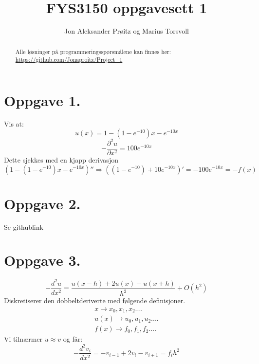 \documentclass[english,notitlepage]{revtex4-1}  %
\begin{document}
\title{FYS3150 oppgavesett 1}

\author{Jon Aleksander Prøitz og Marius Torsvoll}

\begin{abstract}
\noindent Alle løsninger på programmeringsspørsmålene kan finnes her: \\
\url{https://github.com/Jonaproitz/Project_1}
\end{abstract}

\maketitle


\section*{Oppgave 1.}
    \label{sec:oppgave1}
    Vis at:
    \begin{equation*}
            u(x) 
        =   1-(1-e^{-10})x - e^{-10x}
    \end{equation*}
    \begin{equation*}
            -\frac{\partial^2 u}{\partial x^2} 
        =   100e^{-10x}
    \end{equation*}
    Dette sjekkes med en kjapp derivasjon
    \begin{equation*}
            \left(1-(1-e^{-10})x - e^{-10x}\right)'' 
        \Rightarrow 
            \left((1-e^{-10}) + 10e^{-10x} \right)' 
        =   -100e^{-10x}
        =   -f(x)
    \end{equation*}


\section*{Oppgave 2.}
    \label{sec:oppgave2}
    Se githublink 


\section*{Oppgave 3.}
    \begin{equation*}
            -\frac{d ^2 u}{dx^2} 
        =   \frac{u(x-h)+2u(x)- u(x+h)}{h^2} + O(h^2)
    \end{equation*}
    Diskretiserer den dobbeltderiverte med følgende definisjoner.
    \begin{align*}
            x 
        \rightarrow 
            x_0, x_1, x_2 ....\\
            u(x) 
        \rightarrow 
            u_0, u_1, u_2 ....\\
            f(x) 
        \rightarrow 
            f_0, f_1 , f_2 ....
    \end{align*}
    Vi tilnærmer $u \approx v$ og får:
    \begin{equation*}
            -\frac{d^2 v_i}{dx^2} 
        =   -v_{i-1} + 2v_i - v_{i+1} 
        =   f_ih^2
    \end{equation*}
\end{document}
